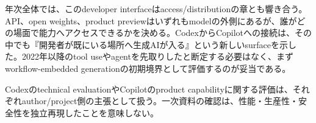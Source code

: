 年次全体では、このdeveloper interfaceはaccess/distributionの章とも響き合う。API、open weights、product previewはいずれもmodelの外側にあるが、誰がどの場面で能力へアクセスできるかを決める。CodexからCopilotへの接続は、その中でも『開発者が既にいる場所へ生成AIが入る』という新しいsurfaceを示した。2022年以降のtool useやagentを先取りしたと断定する必要はなく、まずworkflow-embedded generationの初期境界として評価するのが妥当である。\autocite{src-089fe2c6fbb1,src-47d0c87b08f0,src-5a992319f41e,src-890a73c0b288}


\begin{claimboundary}
Codexのtechnical evaluationやCopilotのproduct capabilityに関する評価は、それぞれauthor/project側の主張として扱う。一次資料の確認は、性能・生産性・安全性を独立再現したことを意味しない。\autocite{src-089fe2c6fbb1,src-47d0c87b08f0,src-5a992319f41e,src-890a73c0b288}
\end{claimboundary}
